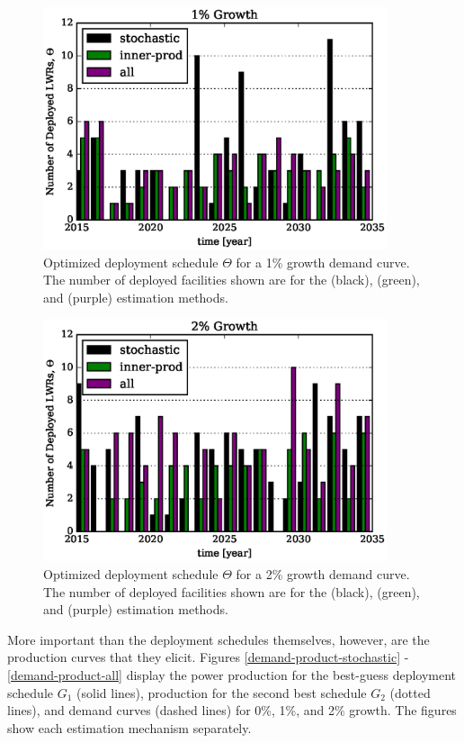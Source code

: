 \begin{figure}[htb]
\centering
\includegraphics[width=0.9\textwidth]{deploy-1.eps}
\caption{Optimized deployment schedule $\Theta$ for a 1\% growth
demand curve. The number of deployed facilities shown are
for the \stochastic (black), \innerprod (green), and \allflag (purple)
estimation methods.}
\label{deploy-1}
\end{figure}

\begin{figure}[htb]
\centering
\includegraphics[width=0.9\textwidth]{deploy-2.eps}
\caption{Optimized deployment schedule $\Theta$ for a 2\% growth
demand curve. The number of deployed facilities shown are
for the \stochastic (black), \innerprod (green), and \allflag (purple)
estimation methods.}
\label{deploy-2}
\end{figure}

\clearpage

More important than the deployment schedules themselves, however, are the
production curves that they elicit.
Figures \ref{demand-product-stochastic} -
\ref{demand-product-all} display the
power production for the best-guess deployment schedule $G_1$ (solid lines),
production for the second best schedule $G_2$ (dotted lines),
and demand curves (dashed lines) for 0\%, 1\%, and 2\% growth.
The figures show each estimation mechanism separately.

